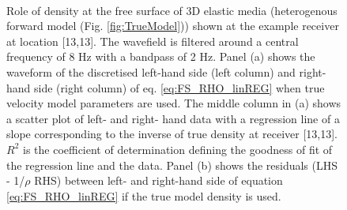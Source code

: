 \documentclass[]{article}
\begin{document}
	\begin{figure}[H] \centering
		\begin{subfigure}[t]{0.8\linewidth}
			\centering
		\end{subfigure}\\
		\begin{subfigure}[t]{0.8\linewidth}
			\centering
		\end{subfigure}
	\caption{Role of density at the free surface of 3D elastic media (heterogenous forward model (Fig. \ref{fig:TrueModel})) shown at the example receiver at location [13,13]. The wavefield is filtered around a central frequency of 8 Hz with a bandpass of 2 Hz. Panel (a) shows the waveform of the discretised left-hand side (left column) and right-hand side (right column) of eq. \eqref{eq:FS_RHO_linREG} when true velocity model parameters are used. The middle column in (a) shows a scatter plot of left- and right- hand data with a regression line of a slope corresponding to the inverse of true density at receiver [13,13]. $R^{2}$ is the coefficient of determination defining the goodness of fit of the regression line and the data. Panel (b) shows the residuals (LHS - 1/$\rho$ RHS) between left- and right-hand side of equation \eqref{eq:FS_RHO_linREG} if the true model density is used.}
	\label{fig:signal_rho_ELASTIC}	
	\end{figure}
\end{document}

